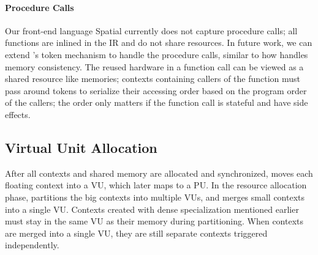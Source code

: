 \paragraph{Procedure Calls}
Our front-end language Spatial currently does not capture procedure calls; 
all functions are inlined in the IR and do not share resources. 
In future work, we can extend \name's token mechanism to handle the procedure calls, similar to how
\name handles memory consistency.
The reused hardware in a function call 
can be viewed as a shared resource like memories; contexts containing callers of the function
must pass around tokens to serialize their accessing order based on the program order of the
callers; the order only matters if the function call is stateful and have side effects.

\subsection{Virtual Unit Allocation}
After all contexts and shared memory are allocated and synchronized, 
\name moves each floating context into a VU, which later maps to a PU.
In the resource allocation phase, \name partitions the big contexts into multiple VUs, 
and merges small contexts into a single VU. 
Contexts created with dense specialization mentioned earlier must stay in the same VU as their
memory during partitioning.
When contexts are merged into a single VU, they are still
separate contexts triggered independently.
